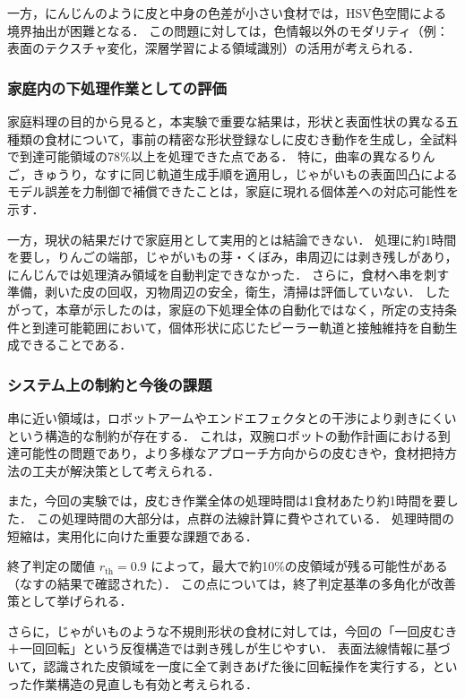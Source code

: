 一方，にんじんのように皮と中身の色差が小さい食材では，HSV色空間による境界抽出が困難となる．
この問題に対しては，色情報以外のモダリティ（例：表面のテクスチャ変化，深層学習による領域識別）の活用が考えられる．

\begin{revisionblock}
\subsubsection{家庭内の下処理作業としての評価}
家庭料理の目的から見ると，本実験で重要な結果は，形状と表面性状の異なる五種類の食材について，事前の精密な形状登録なしに皮むき動作を生成し，全試料で到達可能領域の78\%以上を処理できた点である．
特に，曲率の異なるりんご，きゅうり，なすに同じ軌道生成手順を適用し，じゃがいもの表面凹凸によるモデル誤差を力制御で補償できたことは，家庭に現れる個体差への対応可能性を示す．

一方，現状の結果だけで家庭用として実用的とは結論できない．
処理に約1時間を要し，りんごの端部，じゃがいもの芽・くぼみ，串周辺には剥き残しがあり，にんじんでは処理済み領域を自動判定できなかった．
さらに，食材へ串を刺す準備，剥いた皮の回収，刃物周辺の安全，衛生，清掃は評価していない．
したがって，本章が示したのは，家庭の下処理全体の自動化ではなく，所定の支持条件と到達可能範囲において，個体形状に応じたピーラー軌道と接触維持を自動生成できることである．
\end{revisionblock}

\subsubsection{システム上の制約と今後の課題}

串に近い領域は，ロボットアームやエンドエフェクタとの干渉により剥きにくいという構造的な制約が存在する．
これは，双腕ロボットの動作計画における到達可能性の問題であり，より多様なアプローチ方向からの皮むきや，食材把持方法の工夫が解決策として考えられる．

また，今回の実験では，皮むき作業全体の処理時間は1食材あたり約1時間を要した．
この処理時間の大部分は，点群の法線計算に費やされている．
処理時間の短縮は，実用化に向けた重要な課題である．

終了判定の閾値 $r_{\mathrm{th}} = 0.9$ によって，最大で約10\%の皮領域が残る可能性がある（なすの結果で確認された）．
この点については，終了判定基準の多角化が改善策として挙げられる．

さらに，じゃがいものような不規則形状の食材に対しては，今回の「一回皮むき＋一回回転」という反復構造では剥き残しが生じやすい．
表面法線情報に基づいて，認識された皮領域を一度に全て剥きあげた後に回転操作を実行する，といった作業構造の見直しも有効と考えられる．

